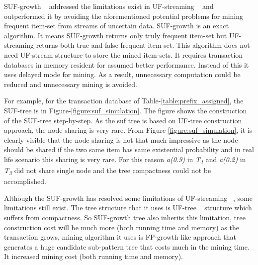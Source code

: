 \documentclass[conference]{IEEEtran}
\begin{document}
SUF-growth ~\cite{DBLP:conf/icde/LeungH09} addressed the limitations exist in UF-streaming ~\cite{DBLP:conf/icde/LeungH09} and outperformed it by avoiding the aforementioned potential problems for mining frequent item-set from streams of uncertain data. SUF-growth is an exact algorithm. It means SUF-growth returns only truly frequent item-set but UF-streaming returns both true and false frequent item-set. This algorithm does not need UF-stream structure to store the mined item-sets. It requires transaction databases in memory resident for assumed better performance. Instead of this it uses delayed mode for mining. As a result, unnecessary computation could be reduced and unnecessary mining is avoided.
%

For example, for the transaction database of Table-\ref{table:prefix_assigned}, the SUF-tree is in Figure-\ref{figure:suf_simulation}. The figure shows the construction of the SUF-tree step-by-step. As the suf tree is based on UF-tree construction approach, the node sharing is very rare. From Figure-\ref{figure:suf_simulation}, it is clearly visible that the node sharing is not that much impressive as the node should be shared if the two same item has same existential probability and in real life scenario this sharing is very rare. For this reason \emph{a(0.9)} in \emph{T\textsubscript{1}} and \emph{a(0.2)} in \emph{T\textsubscript{3}} did not share single node and the tree compactness could not be accomplished. 

Although the SUF-growth has resolved some limitations of UF-streaming ~\cite{DBLP:conf/icde/LeungH09}, some limitations still exist. The tree structure that it uses is UF-tree ~\cite{DBLP:conf/kdd/GadeWK04} structure which suffers from compactness. So SUF-growth tree also inherits this limitation, tree construction cost will be much more (both running time and memory) as the transaction grows, mining algorithm it uses is FP-growth like approach that generates a huge candidate sub-pattern tree that costs much in the mining time. It increased mining cost (both running time and memory).
\end{document}
